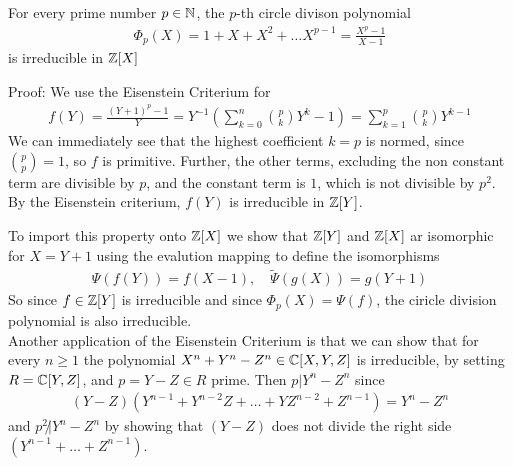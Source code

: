 \begin{corollary}[]
	For every prime number $p \in \mathbb{N}$, the $p$-th circle divison polynomial
	\begin{align*}
		\Phi_p(X) = 1 + X + X^2 + \ldots X^{p-1} = \frac{X^p - 1}{X - 1}
	\end{align*}
	is irreducible in $\mathbb{Z}[X]$
\end{corollary}
Proof: We use the Eisenstein Criterium for
\begin{align*}
	f(Y) = \frac{(Y+1)^p - 1}{Y} = Y^{-1} \left(\sum_{k = 0}^{n} \binom{p}{k} Y^k - 1\right) = \sum_{k=1}^{p} \binom{p}{k} Y^{k-1}
\end{align*}
We can immediately see that the highest coefficient $k = p$ is normed, since $\binom{p}{p} = 1$, so $f$ is primitive. Further, the other terms, excluding the non constant term are divisible by $p$, and the constant term is $1$, which is not divisible by $p^2$. By the Eisenstein criterium, $f(Y)$ is irreducible in $\mathbb{Z}[Y]$.

To import this property onto $\mathbb{Z}[X]$ we show that $\mathbb{Z}[Y]$ and $\mathbb{Z}[X]$ ar isomorphic for $X = Y + 1$ using the evalution mapping to define the isomorphisms
\begin{align*}
	\Psi(f(Y)) = f(X-1), \quad \tilde{\Psi}(g(X)) = g(Y + 1)
\end{align*}
So since $f \in \mathbb{Z}[Y]$ is irreducible and since $\Phi_p(X) = \Psi(f)$, the ciricle division polynomial is also irreducible.\\

Another application of the Eisenstein Criterium is that we can show that for every $n \geq 1$ the polynomial $X^n + Y^n - Z^n \in \mathbb{C}[X,Y,Z]$ is irreducible, by setting $R = \mathbb{C}[Y,Z]$, and $p = Y - Z \in R$ prime. Then $p| Y^n - Z^n$ since
\begin{align*}
	(Y - Z)(Y^{n-1} + Y^{n-2}Z + \ldots + YZ^{n-2} + Z^{n-1}) = Y^n - Z^n
\end{align*}
and $p^2 \not| Y^n - Z^n$ by showing that $(Y - Z)$ does not divide the right side $(Y^{n-1} + \ldots + Z^{n-1})$.


